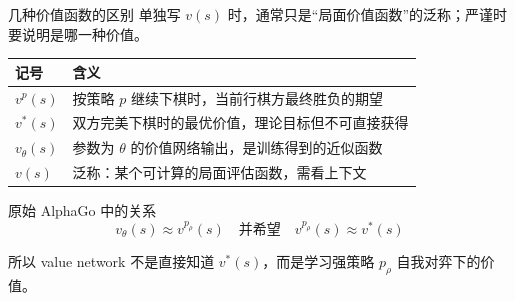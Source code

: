 \documentclass[UTF8,aspectratio=169,10pt]{ctexbeamer}
\begin{document}
\begin{frame}{几种价值函数的区别}
  单独写 $v(s)$ 时，通常只是“局面价值函数”的泛称；严谨时要说明是哪一种价值。

  \vspace{0.08cm}
  \begin{center}
    \begin{tabular}{p{}p{}}
      \toprule
      记号 & 含义 \\
      \midrule
      $v^p(s)$ & 按策略 $p$ 继续下棋时，当前行棋方最终胜负的期望 \\
      $v^*(s)$ & 双方完美下棋时的最优价值，理论目标但不可直接获得 \\
      $v_{\theta}(s)$ & 参数为 $\theta$ 的价值网络输出，是训练得到的近似函数 \\
      $v(s)$ & 泛称：某个可计算的局面评估函数，需看上下文 \\
      \bottomrule
    \end{tabular}
  \end{center}

  \vspace{0.14cm}
  \begin{block}{原始 AlphaGo 中的关系}
    \[
      v_{\theta}(s) \approx v^{p_{\rho}}(s)
      \quad \text{并希望} \quad
      v^{p_{\rho}}(s) \approx v^*(s)
    \]
  \end{block}

  \begin{center}
    \small
    所以 value network 不是直接知道 $v^*(s)$，而是学习强策略 $p_{\rho}$ 自我对弈下的价值。
  \end{center}
\end{frame}
\end{document}
